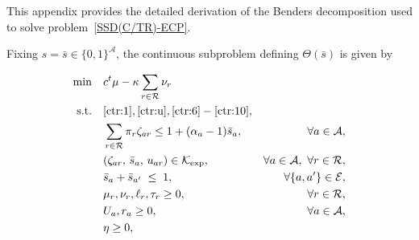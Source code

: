 \documentclass[letter,11pt, reqno]{amsart}
\def\A{\mathcal{A}}
\def\RR{\mathcal{R}}
\begin{document}
This appendix provides the detailed derivation of the Benders decomposition
used to solve problem~\ref{SSD(C/TR)-ECP}.

Fixing $s=\bar s\in\{0,1\}^{\mathcal A}$, the continuous subproblem defining
$\Theta(\bar s)$ is given by

\setlength{\abovedisplayskip}{6pt}
\setlength{\belowdisplayskip}{6pt}
\setlength{\abovedisplayshortskip}{4pt}
\setlength{\belowdisplayshortskip}{4pt}

\begin{align}
\min \quad
& c^{t}\mu - \kappa \sum_{r\in\mathcal{R}} \nu_r
\nonumber\\
\text{s.t.}\quad
& \eqref{ctr:1}, \eqref{ctr:u}, \eqref{ctr:6}-\eqref{ctr:10},\nonumber\\
& \sum_{r\in\RR} \pi_r \zeta_{ar} \le 1 + (\alpha_a-1)\bar s_a, & \forall a\in\mathcal{A}, \label{linear_s}\\
&(\zeta_{ar},\, \bar s_a,\,
u_{ar})
\in \mathcal{K}_{\exp},& \forall a\in\mathcal{A},\ \forall r\in\mathcal{R},\label{exp_s}\\
& \bar{s}_a + \bar{s}_{a'} \;\le\; 1, & \forall \{a,a'\}\in\mathcal{E},
\label{conflict_benders}\\
& \mu_r, \nu_r, \ell_r, \tau_r \geq 0, & \forall r \in \RR,\nonumber\\
& U_a, r_a \geq 0, & \forall a \in \A,\nonumber\\
& \eta \geq 0, \nonumber
\end{align}
\setlength{\abovedisplayskip}{10pt}
\setlength{\belowdisplayskip}{10pt}
\end{document}
